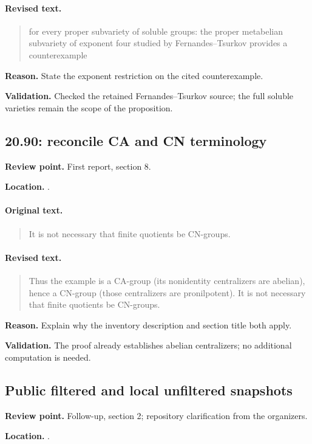 \paragraph{Revised text.}
\begin{quote}\small
for every proper subvariety of soluble groups: the proper metabelian
subvariety of exponent four studied by Fernandes--Tsurkov provides a counterexample
\end{quote}

\noindent\textbf{Reason.} State the exponent restriction on the cited counterexample.

\noindent\textbf{Validation.} Checked the retained Fernandes--Tsurkov source; the full soluble varieties remain the scope of the proposition.

\subsection{20.90: reconcile CA and CN terminology}
\noindent\textbf{Review point.} First report, section 8.\par
\noindent\textbf{Location.} .

\paragraph{Original text.}
\begin{quote}\small
It is not necessary that finite quotients be CN-groups.
\end{quote}

\paragraph{Revised text.}
\begin{quote}\small
Thus the example is a CA-group (its nonidentity centralizers are
abelian), hence a CN-group (those centralizers are pronilpotent).
It is not necessary that finite quotients be CN-groups.
\end{quote}

\noindent\textbf{Reason.} Explain why the inventory description and section title both apply.

\noindent\textbf{Validation.} The proof already establishes abelian centralizers; no additional computation is needed.

\subsection{Public filtered and local unfiltered snapshots}
\noindent\textbf{Review point.} Follow-up, section 2; repository clarification from the organizers.\par
\noindent\textbf{Location.} .

